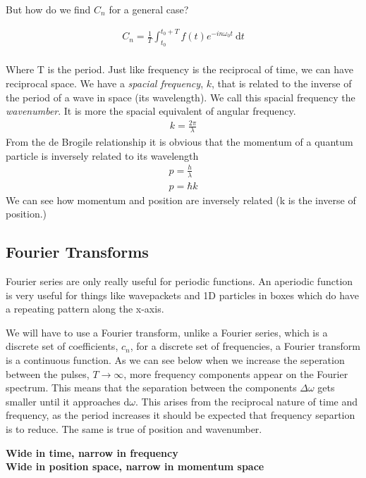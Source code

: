 \documentclass[11pt]{article}
\renewcommand{\d}{\text{d}}
\begin{document}
    But how do we find $C_n$ for a general case?

    \begin{align*}
        C_n = \frac{1}{T} \int_{t_0}^{t_0 + T} f(t) e^{-in\omega_0 t}\ \d{t}\\
    \end{align*}

    Where T is the period. Just like frequency is the reciprocal of time, we can have reciprocal space.
    We have a \emph{spacial frequency}, $k$, that is related to the inverse of the period of a wave in space
    (its wavelength). We call this spacial frequency the \emph{wavenumber}. It is more the spacial equivalent
    of angular frequency.
    \begin{align*}
        k = \frac{2\pi}{\lambda}
    \end{align*}
    From the de Brogile relationship it is obvious that the momentum of a quantum particle is inversely related
    to its wavelength
    \begin{align*}
        p = \frac{h}{\lambda}\\
        p = \hbar k
    \end{align*}
    We can see how momentum and position are inversely related (k is the inverse of position.)

    \subsection{Fourier Transforms}
    Fourier series are only really useful for periodic functions. An aperiodic function is very useful for 
    things like wavepackets and 1D particles in boxes which do have a repeating pattern along the x-axis.
    
    We will have to use a Fourier transform, unlike a Fourier series, which is a discrete set of coefficients,
    \(c_n\), for a discrete set of frequencies, a Fourier transform is a continuous function. As we can see below
    when we increase the seperation between the pulses, \( T \to \infty\), more frequency components appear on
    the Fourier spectrum. This means that the separation between the components \(\Delta\omega\) gets smaller
    until it approaches d\(\omega\). This arises from the reciprocal nature of time and frequency, as the period
    increases it should be expected that frequency separtion is to  reduce. The same is true of position and wavenumber.

    \begin{center}
        \textbf{Wide in time, narrow in frequency}\\
        \textbf{Wide in position space, narrow in momentum space}
    \end{center}
\end{document}
